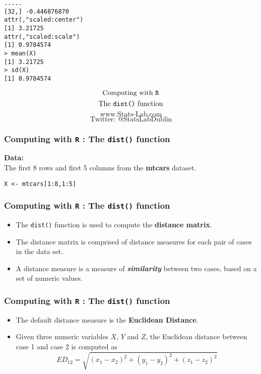 \documentclass{beamer}
\begin{document}
\begin{frame}[fragile]
\Large
\begin{verbatim}
.....
[32,] -0.446876870
attr(,"scaled:center")
[1] 3.21725
attr(,"scaled:scale")
[1] 0.9784574
> mean(X)
[1] 3.21725
> sd(X)
[1] 0.9784574
\end{verbatim}
\end{frame}
\begin{frame}
\Huge
\[\mbox{Computing with \texttt{R}}\]
\[\mbox{The \texttt{dist()} function}\]
\bigskip
\LARGE
\[\mbox{www.Stats-Lab.com}\]
\[\mbox{Twitter: @StatsLabDublin}\]
\end{frame}
\begin{frame}[fragile]
\frametitle{Computing with \texttt{R} : The \texttt{dist()} function}
\Large
\vspace{-1cm}
\textbf{Data:} \\
The first 8 rows and first 5 columns from the \textbf{mtcars} dataset.

\begin{framed}
\begin{verbatim}
X <- mtcars[1:8,1:5]
\end{verbatim}
\end{framed}
\end{frame}
\begin{frame}[fragile]
\frametitle{Computing with \texttt{R} : The \texttt{dist()} function}
\Large
\vspace{-1cm}

\begin{itemize}
\item The \texttt{dist()} function is used to compute the \textbf{distance matrix}.
\item The distance matrix is comprised of distance measures for each pair of cases in the data set.
\item A distance measure is a measure of \emph{\bf{similarity}} between two cases, based on a set of numeric values.
\end{itemize}
\end{frame}
\begin{frame}[fragile]
\frametitle{Computing with \texttt{R} : The \texttt{dist()} function}
\Large
\vspace{-1cm}

\begin{itemize}
\item The default distance measure is the \textbf{Euclidean Distance}.
\item Given three numeric variables $X$, $Y$ and $Z$, the Euclidean distance between case 1 and case 2 is computed as
\[ED_{12} =  \sqrt{(x_1-x_2)^2 + (y_1-y_2)^2 + (z_1-z_2)^2}\]
\end{itemize}
\end{frame}
\end{document}
